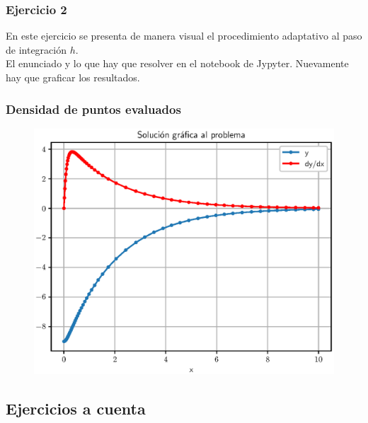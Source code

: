 \documentclass[12pt]{beamer}
\begin{document}
\begin{frame}
\frametitle{Ejercicio 2}
En este ejercicio se presenta de manera visual el procedimiento adaptativo al paso de integración $h$.
\\
\bigskip
\pause
El enunciado y lo que hay que resolver en el notebook de Jypyter. Nuevamente hay que graficar los resultados.
\end{frame}
\begin{frame}
\frametitle{Densidad de puntos evaluados}
\begin{figure}
    \centering
    \includegraphics[scale=0.55]{Imagenes/Ejercicio_RKAdaptativo_02.eps}
\end{figure}
\end{frame}


\subsection{Ejercicios a cuenta}
\end{document}
